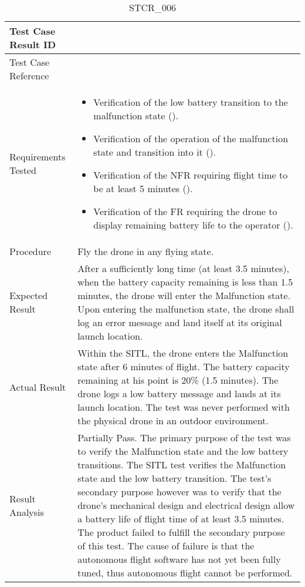 \documentclass[12pt, titlepage]{article}
\begin{document}
\begin{table}[!h]
\begin{center}
\caption {STCR\_006}
\label{tab:STCR_006}
\begin{tabular}{ | m{3.2cm} | m{12.2cm} | } 
\hline
Test Case Result ID & \nameref{tab:STCR_006} \\ 
\hline
Test Case Reference & \nameref{tab:STC_006}  \\ 
\hline
Requirements Tested & \begin{itemize}
    \item Verification of the low battery transition to the malfunction state (\nameref{SR_011}). 
    \item Verification of the operation of the malfunction state and transition into it (\nameref{STA_009}).
    \item Verification of the NFR requiring flight time to be at least 5 minutes (\nameref{USE_003}). 
    \item Verification of the FR requiring the drone to display remaining battery life to the operator (\nameref{SR_003}). 
\end{itemize}
\\  
\hline
Procedure &  Fly the drone in any flying state.  \\ 
\hline
Expected Result & After a sufficiently long time (at least 3.5 minutes), when the battery capacity remaining is less than 1.5 minutes, the drone will enter the Malfunction state. Upon entering the malfunction state, the drone shall log an error message and land itself at its original launch location.   \\ 
\hline
Actual Result & Within the SITL, the drone enters the Malfunction state after 6 minutes of flight. The battery capacity remaining at his point is 20\% (1.5 minutes). The drone logs a low battery message and lands at its launch location. The test was never performed with the physical drone in an outdoor environment. \\ 
\hline
Result Analysis & Partially Pass. The primary purpose of the test was to verify the Malfunction state and the low battery transitions. The SITL test verifies the Malfunction state and the low battery transition. The test's secondary purpose however was to verify that the drone's mechanical design and electrical design allow a battery life of flight time of at least 3.5 minutes. The product failed to fulfill the secondary purpose of this test. The cause of failure is that the autonomous flight software has not yet been fully tuned, thus autonomous flight cannot be performed. \\ 
\hline
\end{tabular}
\end{center}
\end{table}
\end{document}
